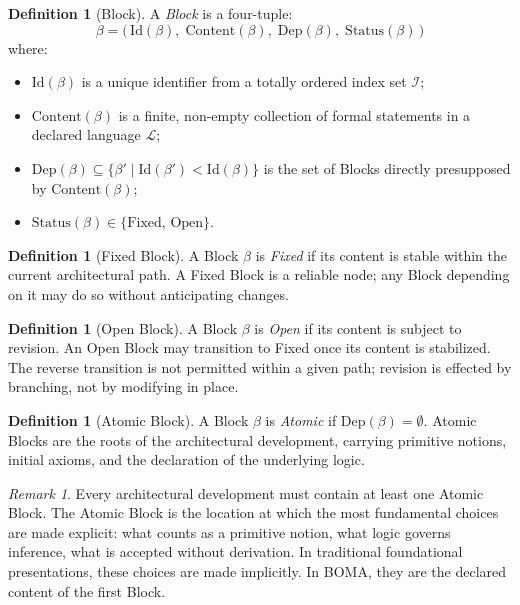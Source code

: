 \documentclass[12pt, a4paper]{article}
\theoremstyle{plain}
\theoremstyle{definition}
\newtheorem{definition}[theorem]{Definition}
\theoremstyle{remark}
\newtheorem{remark}[theorem]{Remark}
\newcommand{\BOMA}{\textsf{BOMA}}
\begin{document}
\begin{definition}[Block]
\label{def:block}
A \emph{Block} is a four-tuple:
\[
  \beta
  = \bigl(\,\mathrm{Id}(\beta),\;
           \mathrm{Content}(\beta),\;
           \mathrm{Dep}(\beta),\;
           \mathrm{Status}(\beta)\,\bigr)
\]
where:
\begin{itemize}
  \item $\mathrm{Id}(\beta)$ is a unique identifier from a
        totally ordered index set $\mathcal{I}$;
  \item $\mathrm{Content}(\beta)$ is a finite, non-empty
        collection of formal statements in a declared language
        $\mathcal{L}$;
  \item $\mathrm{Dep}(\beta) \subseteq
        \{\beta' \mid \mathrm{Id}(\beta') < \mathrm{Id}(\beta)\}$
        is the set of Blocks directly presupposed by
        $\mathrm{Content}(\beta)$;
  \item $\mathrm{Status}(\beta) \in \{\mathrm{Fixed},\,
        \mathrm{Open}\}$.
\end{itemize}
\end{definition}

\begin{definition}[Fixed Block]
\label{def:fixed}
A Block $\beta$ is \emph{Fixed} if its content is stable within
the current architectural path. A Fixed Block is a reliable
node; any Block depending on it may do so without anticipating
changes.
\end{definition}

\begin{definition}[Open Block]
\label{def:open}
A Block $\beta$ is \emph{Open} if its content is subject to
revision. An Open Block may transition to Fixed once its content
is stabilized. The reverse transition is not permitted within a
given path; revision is effected by branching, not by modifying
in place.
\end{definition}

\begin{definition}[Atomic Block]
\label{def:atomic}
A Block $\beta$ is \emph{Atomic} if $\mathrm{Dep}(\beta) =
\emptyset$. Atomic Blocks are the roots of the architectural
development, carrying primitive notions, initial axioms, and the
declaration of the underlying logic.
\end{definition}

\begin{remark}
\label{rem:atomic-significance}
Every architectural development must contain at least one
Atomic Block. The Atomic Block is the location at which the most
fundamental choices are made explicit: what counts as a primitive
notion, what logic governs inference, what is accepted without
derivation. In traditional foundational presentations, these
choices are made implicitly. In \BOMA{}, they are the declared
content of the first Block.
\end{remark}
\end{document}
